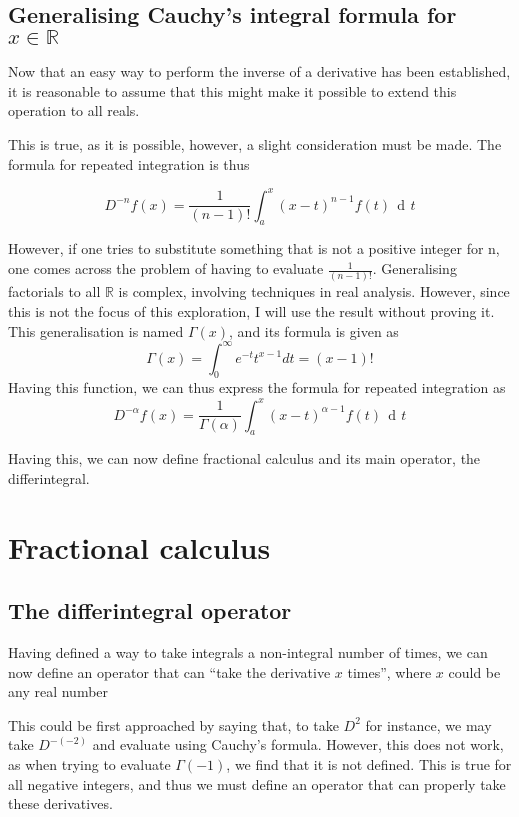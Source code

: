 \documentclass{article}
\DeclareMathOperator{\di}{\,d\!}
\begin{document}
\subsection{Generalising Cauchy's integral formula for $x \in \mathbb{R}$}

Now that an easy way to perform the inverse of a derivative has been
established, it is reasonable to assume that this might make it possible to
extend this operation to all reals.

This is true, as it is possible, however, a slight consideration must be made.
The formula for repeated integration is thus

$$
D^{-n}f(x) = \frac{1}{(n-1)!}\int_a^{x}\left(x-t\right)^{n-1}f(t)\di t
$$

However, if one tries to substitute something that is not a positive integer
for n, one comes across the problem of having to evaluate
$\frac{1}{(n-1)!}$. Generalising factorials to all $\mathbb{R}$ is complex,
involving techniques in real analysis. However, since this is not the focus of
this exploration, I will use the result without proving it. This generalisation
is named $\Gamma(x)$, and its formula is given as
$$
\Gamma(x)=\int_0^{\infty} e^{-t}t^{x-1}dt = (x-1)!
$$
Having this function, we can thus express the formula for repeated integration as
$$
D^{-\alpha}f(x) = \frac{1}{\Gamma\left(\alpha\right)}\int_a^{x}\left(x-t\right)^{\alpha-1} f(t)\di t
$$

Having this, we can now define fractional calculus and its main operator,
the differintegral.


\section{Fractional calculus}
\subsection{The differintegral operator}
Having defined a way to take integrals a non-integral number of times, we can
now define an operator that can ``take the derivative $x$ times'', where
$x$ could be any real number

This could be first approached by saying that, to take $D^2$ for instance, we
may take $D^{-\left(-2\right)}$ and evaluate using Cauchy's formula. However,
this does not work, as when trying to evaluate $\Gamma(-1)$, we find that it is
not defined. This is true for all negative integers, and thus we must define an
operator that can properly take these derivatives.
\end{document}
